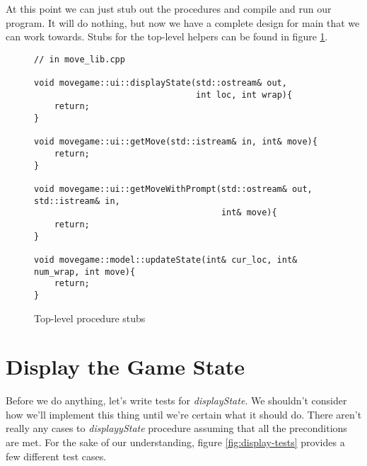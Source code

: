 \documentclass[nobib]{tufte-handout}
\begin{document}
At this point we can just stub out the procedures and compile and run our program. It will do nothing, but now we have a complete design for main that we can work towards. Stubs for the top-level helpers can be found in figure \ref{fig:top-stubs}.

\begin{figure}[!htbp]
\begin{lstlisting}
// in move_lib.cpp

void movegame::ui::displayState(std::ostream& out,
	                            int loc, int wrap){
	return;	                            
}	       

void movegame::ui::getMove(std::istream& in, int& move){
	return;
}
 
void movegame::ui::getMoveWithPrompt(std::ostream& out, std::istream& in,
								     int& move){
	return;
}
                     
void movegame::model::updateState(int& cur_loc, int& num_wrap, int move){
	return;
}
\end{lstlisting}
\caption{Top-level procedure stubs}
\label{fig:top-stubs}
\end{figure}

\section{Display the Game State}

Before we do anything, let's write tests for \textit{displayState}. We shouldn't consider how we'll implement this thing until we're certain what it should do. There aren't really any cases to \textit{displayyState} procedure assuming that all the preconditions are met.  For the sake of our understanding, figure \ref{fig:display-tests} provides a few different test cases. 
\end{document}
